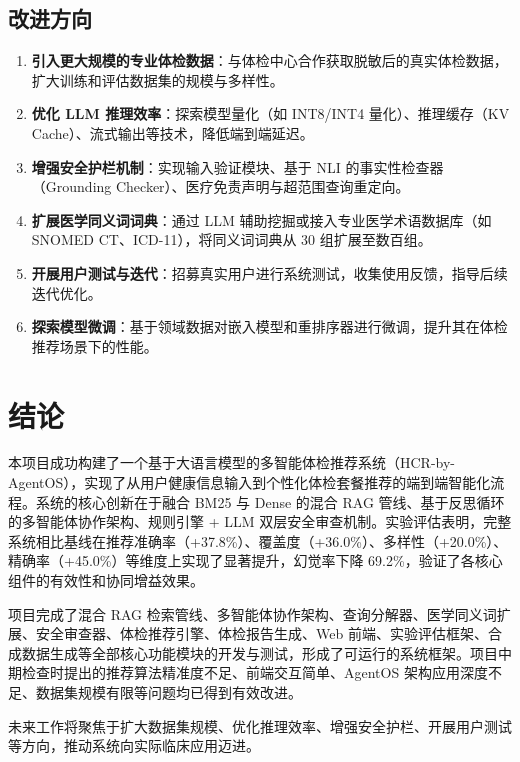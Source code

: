 \documentclass[12pt,a4paper]{article}
\begin{document}
\subsection{改进方向}

\begin{enumerate}[leftmargin=2em]
    \item \textbf{引入更大规模的专业体检数据}：与体检中心合作获取脱敏后的真实体检数据，扩大训练和评估数据集的规模与多样性。
    \item \textbf{优化 LLM 推理效率}：探索模型量化（如 INT8/INT4 量化）、推理缓存（KV Cache）、流式输出等技术，降低端到端延迟。
    \item \textbf{增强安全护栏机制}：实现输入验证模块、基于 NLI 的事实性检查器（Grounding Checker）、医疗免责声明与超范围查询重定向。
    \item \textbf{扩展医学同义词词典}：通过 LLM 辅助挖掘或接入专业医学术语数据库（如 SNOMED CT、ICD-11），将同义词词典从 30 组扩展至数百组。
    \item \textbf{开展用户测试与迭代}：招募真实用户进行系统测试，收集使用反馈，指导后续迭代优化。
    \item \textbf{探索模型微调}：基于领域数据对嵌入模型和重排序器进行微调，提升其在体检推荐场景下的性能。
\end{enumerate}

\section{结论}
\label{sec:conclusion}

本项目成功构建了一个基于大语言模型的多智能体检推荐系统（HCR-by-AgentOS），实现了从用户健康信息输入到个性化体检套餐推荐的端到端智能化流程。系统的核心创新在于融合 BM25 与 Dense 的混合 RAG 管线、基于反思循环的多智能体协作架构、规则引擎 + LLM 双层安全审查机制。实验评估表明，完整系统相比基线在推荐准确率（+37.8\%）、覆盖度（+36.0\%）、多样性（+20.0\%）、精确率（+45.0\%）等维度上实现了显著提升，幻觉率下降 69.2\%，验证了各核心组件的有效性和协同增益效果。

项目完成了混合 RAG 检索管线、多智能体协作架构、查询分解器、医学同义词扩展、安全审查器、体检推荐引擎、体检报告生成、Web 前端、实验评估框架、合成数据生成等全部核心功能模块的开发与测试，形成了可运行的系统框架。项目中期检查时提出的推荐算法精准度不足、前端交互简单、AgentOS 架构应用深度不足、数据集规模有限等问题均已得到有效改进。

未来工作将聚焦于扩大数据集规模、优化推理效率、增强安全护栏、开展用户测试等方向，推动系统向实际临床应用迈进。
\end{document}

